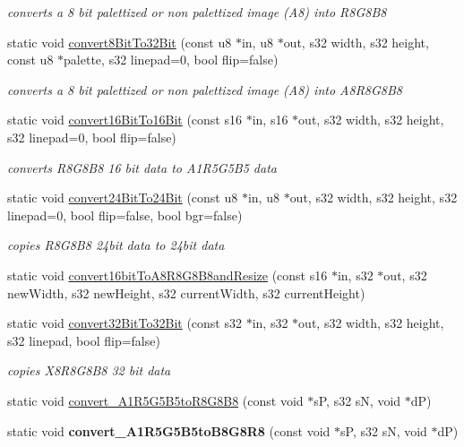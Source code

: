\begin{DoxyCompactItemize}
\begin{DoxyCompactList}\small\item\em converts a 8 bit palettized or non palettized image (A8) into R8\-G8\-B8 \end{DoxyCompactList}\item 
static void \hyperlink{classirr_1_1video_1_1_c_color_converter_a38ff2e832aa377d88dc9fe5c59713674}{convert8\-Bit\-To32\-Bit} (const u8 $\ast$in, u8 $\ast$out, s32 width, s32 height, const u8 $\ast$palette, s32 linepad=0, bool flip=false)
\begin{DoxyCompactList}\small\item\em converts a 8 bit palettized or non palettized image (A8) into A8\-R8\-G8\-B8 \end{DoxyCompactList}\item 
static void \hyperlink{classirr_1_1video_1_1_c_color_converter_a9ce1fd3fc97089f50a51f13edfc46185}{convert16\-Bit\-To16\-Bit} (const s16 $\ast$in, s16 $\ast$out, s32 width, s32 height, s32 linepad=0, bool flip=false)
\begin{DoxyCompactList}\small\item\em converts R8\-G8\-B8 16 bit data to A1\-R5\-G5\-B5 data \end{DoxyCompactList}\item 
static void \hyperlink{classirr_1_1video_1_1_c_color_converter_af31d361b66eb2ceabab969381a33f99e}{convert24\-Bit\-To24\-Bit} (const u8 $\ast$in, u8 $\ast$out, s32 width, s32 height, s32 linepad=0, bool flip=false, bool bgr=false)
\begin{DoxyCompactList}\small\item\em copies R8\-G8\-B8 24bit data to 24bit data \end{DoxyCompactList}\item 
static void \hyperlink{classirr_1_1video_1_1_c_color_converter_ab1845e4487bc0ec98e39a64868b8bbc3}{convert16bit\-To\-A8\-R8\-G8\-B8and\-Resize} (const s16 $\ast$in, s32 $\ast$out, s32 new\-Width, s32 new\-Height, s32 current\-Width, s32 current\-Height)
\item 
static void \hyperlink{classirr_1_1video_1_1_c_color_converter_a7e2729378d5af783571f5a7b5d70adf8}{convert32\-Bit\-To32\-Bit} (const s32 $\ast$in, s32 $\ast$out, s32 width, s32 height, s32 linepad, bool flip=false)
\begin{DoxyCompactList}\small\item\em copies X8\-R8\-G8\-B8 32 bit data \end{DoxyCompactList}\item 
static void \hyperlink{classirr_1_1video_1_1_c_color_converter_a8b5ccd5f7d5c9d8413c694f98fe630ed}{convert\-\_\-\-A1\-R5\-G5\-B5to\-R8\-G8\-B8} (const void $\ast$s\-P, s32 s\-N, void $\ast$d\-P)
\item 
\hypertarget{classirr_1_1video_1_1_c_color_converter_ae0835c78b1db72bd817499d344cd9434}{static void {\bfseries convert\-\_\-\-A1\-R5\-G5\-B5to\-B8\-G8\-R8} (const void $\ast$s\-P, s32 s\-N, void $\ast$d\-P)}\label{classirr_1_1video_1_1_c_color_converter_ae0835c78b1db72bd817499d344cd9434}


\end{DoxyCompactItemize}
